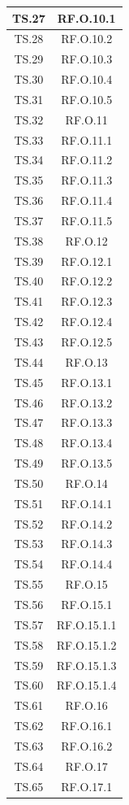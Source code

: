 \documentclass[10pt, a4paper]{article}
\begin{document}
\begin{xltabular}{\textwidth}{|c|c|}
\hline
TS.27 & RF.O.10.1 \\
\hline
TS.28 & RF.O.10.2 \\
\hline
TS.29 & RF.O.10.3 \\
\hline
TS.30 & RF.O.10.4 \\
\hline
TS.31 & RF.O.10.5 \\
\hline
TS.32 & RF.O.11 \\
\hline
TS.33 & RF.O.11.1 \\
\hline
TS.34 & RF.O.11.2 \\
\hline
TS.35 & RF.O.11.3 \\
\hline
TS.36 & RF.O.11.4 \\
\hline
TS.37 & RF.O.11.5 \\
\hline
TS.38 & RF.O.12 \\
\hline
TS.39 & RF.O.12.1 \\
\hline
TS.40 & RF.O.12.2 \\
\hline
TS.41 & RF.O.12.3 \\
\hline
TS.42 & RF.O.12.4 \\
\hline
TS.43 & RF.O.12.5 \\
\hline
TS.44 & RF.O.13 \\
\hline
TS.45 & RF.O.13.1 \\
\hline
TS.46 & RF.O.13.2 \\
\hline
TS.47 & RF.O.13.3 \\
\hline
TS.48 & RF.O.13.4 \\
\hline
TS.49 & RF.O.13.5 \\
\hline
TS.50 & RF.O.14 \\
\hline
TS.51 & RF.O.14.1 \\
\hline
TS.52 & RF.O.14.2 \\
\hline
TS.53 & RF.O.14.3 \\
\hline
TS.54 & RF.O.14.4 \\
\hline
TS.55 & RF.O.15 \\
\hline
TS.56 & RF.O.15.1 \\
\hline
TS.57 & RF.O.15.1.1 \\
\hline
TS.58 & RF.O.15.1.2 \\
\hline
TS.59 & RF.O.15.1.3 \\
\hline
TS.60 & RF.O.15.1.4 \\
\hline
TS.61 & RF.O.16 \\
\hline
TS.62 & RF.O.16.1 \\
\hline
TS.63 & RF.O.16.2 \\
\hline
TS.64 & RF.O.17 \\
\hline
TS.65 & RF.O.17.1 \\

\end{xltabular}
\end{document}
